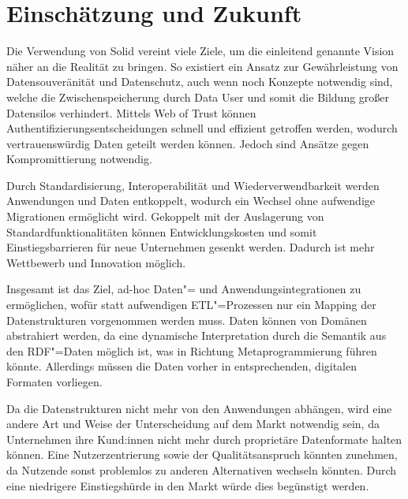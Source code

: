 
\section{Einschätzung und Zukunft}

Die Verwendung von Solid vereint viele Ziele, um die einleitend genannte Vision näher an die Realität zu bringen.
So existiert ein Ansatz zur Gewährleistung von Datensouveränität und Datenschutz, auch wenn noch Konzepte notwendig sind, welche die Zwischenspeicherung durch Data User und somit die Bildung großer Datensilos verhindert.
Mittels Web of Trust können Authentifizierungsentscheidungen schnell und effizient getroffen werden, wodurch vertrauenswürdig Daten geteilt werden können.
Jedoch sind Ansätze gegen Kompromittierung notwendig.

Durch Standardisierung, Interoperabilität und Wiederverwendbarkeit werden Anwendungen und Daten entkoppelt, wodurch ein Wechsel ohne aufwendige Migrationen ermöglicht wird.
Gekoppelt mit der Auslagerung von Standardfunktionalitäten können Entwicklungskosten und somit Einstiegsbarrieren für neue Unternehmen gesenkt werden.
Dadurch ist mehr Wettbewerb und Innovation möglich.

Insgesamt ist das Ziel, ad-hoc Daten"= und Anwendungsintegrationen zu ermöglichen, wofür statt aufwendigen ETL"=Prozessen nur ein Mapping der Datenstrukturen vorgenommen werden muss.
Daten können von Domänen abstrahiert werden, da eine dynamische Interpretation durch die Semantik aus den RDF"=Daten möglich ist, was in Richtung Metaprogrammierung führen könnte.
Allerdings müssen die Daten vorher in entsprechenden, digitalen Formaten vorliegen.

Da die Datenstrukturen nicht mehr von den Anwendungen abhängen, wird eine andere Art und Weise der Unterscheidung auf dem Markt notwendig sein, da Unternehmen ihre Kund:innen nicht mehr durch proprietäre Datenformate halten können.
Eine Nutzerzentrierung sowie der Qualitätsanspruch könnten zunehmen, da Nutzende sonst problemlos zu anderen Alternativen wechseln könnten.
Durch eine niedrigere Einstiegshürde in den Markt würde dies begünstigt werden.
